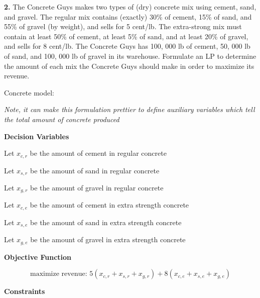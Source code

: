 \documentclass[11pt]{article}
\theoremstyle{definition}
\newcommand{\blu}{
	\color{blue}	
	}
\begin{document}
\newpage

\textbf{2.} The Concrete Guys makes two types of (dry) concrete mix using cement, sand, and gravel. The regular mix contains (exactly) 30\% of cement, 15\% of sand, and 55\% of gravel (by weight), and sells for 5 cent/lb. The extra-strong mix must contain at least 50\% of cement, at least 5\% of sand, and at least 20\% of gravel, and sells for 8 cent/lb. The Concrete Guys has 100, 000 lb of cement, 50, 000 lb of sand, and 100, 000 lb of gravel in its warehouse. Formulate an LP to determine the amount of each mix the Concrete Guys should make in order to maximize its revenue.


{\blu

\begin{center}
Concrete model:
\end{center}

\emph{Note, it can make this formulation prettier to define auxiliary variables which tell the total amount of concrete produced}

\textbf{Decision Variables}

Let $x_{c,r}$ be the amount of cement in regular concrete

Let $x_{s,r}$ be the amount of sand in regular concrete

Let $x_{g,r}$ be the amount of gravel in regular concrete

Let $x_{c,e}$ be the amount of cement in extra strength concrete

Let $x_{s,e}$ be the amount of sand in extra strength concrete

Let $x_{g,e}$ be the amount of gravel in extra strength concrete


\textbf{Objective Function}

\[
\text{maximize revenue: } 5 (x_{c,r} + x_{s,r} + x_{g,r}) + 8 (x_{c,e} + x_{s,e} + x_{g,e})
\]

\textbf{Constraints}

}
\end{document}
